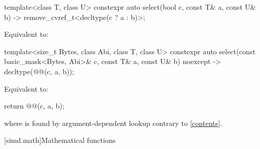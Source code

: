 \begin{itemdecl}
template<class T, class U>
  constexpr auto select(bool c, const T& a, const U& b)
  -> remove_cvref_t<decltype(c ? a : b)>;
\end{itemdecl}

\begin{itemdescr}
\pnum
\effects
Equivalent to: 
\end{itemdescr}

\begin{itemdecl}
template<size_t Bytes, class Abi, class T, class U>
  constexpr auto select(const basic_mask<Bytes, Abi>& c, const T& a, const U& b)
  noexcept -> decltype(@@(c, a, b));
\end{itemdecl}

\begin{itemdescr}
\pnum
\effects
Equivalent to:
\begin{codeblock}
return @@(c, a, b);
\end{codeblock}
where  is found by argument-dependent
lookup contrary to \ref{contents}.
\end{itemdescr}

[simd.math]{Mathematical functions}

